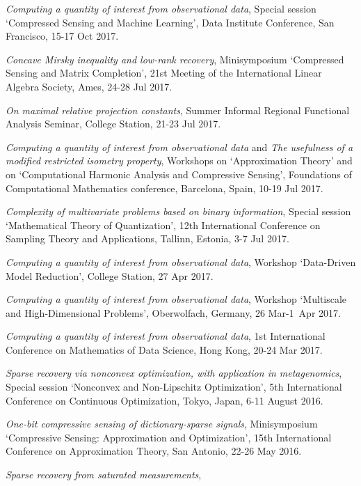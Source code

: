 \documentclass[11pt]{article}
\begin{document}
\item {\sl Computing a quantity of interest from observational data}, 
Special session `Compressed Sensing and Machine Learning', 
Data Institute Conference, San Francisco, 15-17 Oct 2017. 
\item {\sl Concave Mirsky inequality and low-rank recovery}, Minisymposium `Compressed Sensing and Matrix Completion',
21st Meeting of the International Linear Algebra Society, Ames, 24-28 Jul 2017.
\item {\sl On maximal relative projection constants}, Summer Informal Regional Functional Analysis Seminar,
College Station, 21-23 Jul 2017.
\item {\sl Computing a quantity of interest from observational data} and {\sl The usefulness of a modified restricted isometry property}, 
Workshops on `Approximation Theory' and on `Computational Harmonic Analysis and Compressive Sensing',
Foundations of Computational Mathematics conference, 
Barcelona, Spain, 10-19 Jul 2017.
\item {\sl Complexity of multivariate problems based on binary information},
Special session `Mathematical Theory of Quantization',
12th International Conference on Sampling Theory and Applications, 
Tallinn, Estonia, 3-7 Jul 2017.
\item {\sl Computing a quantity of interest from observational data},
Workshop `Data-Driven Model Reduction',
College Station, 27 Apr 2017.
\item {\sl Computing a quantity of interest from observational data},
Workshop `Multiscale and High-Dimensional Problems', Oberwolfach, Germany, 
26 Mar-1~Apr 2017.
\item {\sl Computing a quantity of interest from observational data}, 1st International Conference on Mathematics of Data Science,
Hong Kong, 20-24 Mar 2017.
\item {\sl Sparse recovery via nonconvex optimization, with application in metagenomics},
Special session `Nonconvex and Non-Lipschitz Optimization',
5th International Conference on Continuous Optimization, Tokyo, Japan, 6-11 August 2016.
\item{\sl One-bit compressive sensing of dictionary-sparse signals},
Minisymposium `Compressive Sensing: Approximation and Optimization',
15th International Conference on Approximation Theory, San Antonio, 22-26 May 2016.
\item {\sl Sparse recovery from saturated measurements},
\end{document}
